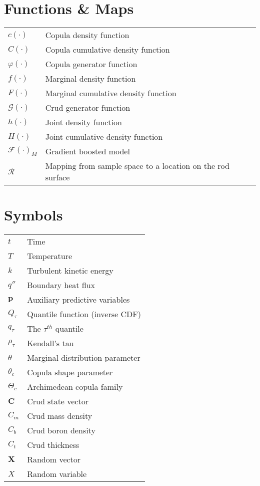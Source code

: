 \pagebreak

\nomenclature

\section*{Functions \& Maps}
\begin{tabular}{l l}
$c(\cdot)$ & Copula density function \\
$C(\cdot)$ & Copula cumulative density function \\
$\varphi(\cdot)$ & Copula generator function \\
$f(\cdot)$ & Marginal density function \\
$F(\cdot)$ & Marginal cumulative density function \\
$\mathcal G(\cdot)$ & Crud generator function \\
$h(\cdot)$ & Joint density function \\
$H(\cdot)$ & Joint cumulative density function \\
$\mathcal F(\cdot)_M$ & Gradient boosted model \\
$\mathcal R$ & Mapping from sample space to a location on the rod surface \\
\end{tabular}

\section*{Symbols}
\begin{tabular}{l l}
$t$ & Time \\
$T$ & Temperature \\
$k$ & Turbulent kinetic energy \\
$q''$ & Boundary heat flux \\
$\mathbf p$ & Auxiliary predictive variables \\
$Q_{\tau}$ & Quantile function (inverse CDF) \\
$q_{\tau}$ & The $\tau^{th}$ quantile \\
$\rho_{\tau}$ & Kendall's tau \\
$\theta$ & Marginal distribution parameter \\
$\theta_c$ & Copula shape parameter \\
$\Theta_c$ & Archimedean copula family \\
$\mathbf C$ & Crud state vector \\
$C_m$ & Crud mass density \\
$C_b$ & Crud boron density \\
$C_t$ & Crud thickness \\
$\mathbf X$ & Random vector \\
$X$ & Random variable \\
\end{tabular}


\listoftables

\listoffigures

\pagebreak
